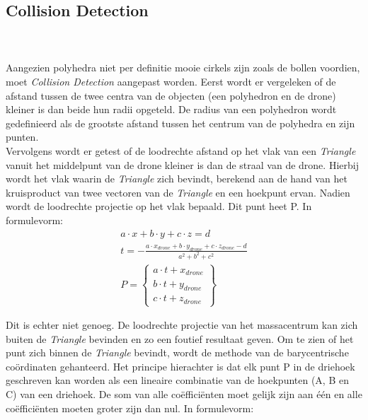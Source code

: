 \subsection{Collision Detection}
\\\\
Aangezien polyhedra niet per definitie mooie cirkels zijn zoals de bollen voordien, moet \textit{Collision Detection} aangepast worden. Eerst wordt er vergeleken of de afstand tussen de twee centra van de objecten (een polyhedron en de drone) kleiner is dan beide hun radii opgeteld. De radius van een polyhedron wordt gedefinieerd als de grootste afstand tussen het centrum van de polyhedra en zijn punten. \\
\noindent
Vervolgens wordt er getest of de loodrechte afstand op het vlak van een \textit{Triangle} vanuit het middelpunt van de drone kleiner is dan de straal van de drone. Hierbij wordt het vlak waarin de \textit{Triangle} zich bevindt, berekend aan de hand van het kruisproduct van twee vectoren van de \textit{Triangle} en een hoekpunt ervan. Nadien wordt de loodrechte projectie op het vlak bepaald. Dit punt heet P. In formulevorm: 
\begin{gather*}
	a\cdot x + b\cdot y + c\cdot z = d \\ 
	t = -\frac{a \cdot x_{drone} + b \cdot y_{drone} + c \cdot z_{drone} - d}{a^2 + b^2 + c^2}  \\ P =
	\begin{Bmatrix}
	a\cdot t + x_{drone}\\ 
	b\cdot t + y_{drone}\\ 
	c\cdot t + z_{drone}
	\end{Bmatrix}
\end{gather*}

\noindent
 Dit is echter niet genoeg. De loodrechte projectie van het massacentrum  kan zich buiten de \textit{Triangle} bevinden en zo een foutief resultaat geven. Om te zien of het punt zich binnen de \textit{Triangle} bevindt, wordt de methode van de barycentrische coördinaten \cite{website:barycentric-coordinates} gehanteerd. Het principe hierachter is dat elk punt P in de driehoek geschreven kan worden als een lineaire combinatie van de hoekpunten (A, B en C) van een driehoek. De som van alle co\"effici\"enten moet gelijk zijn aan één en alle co\"effici\"enten moeten groter zijn dan nul. In formulevorm:
 
